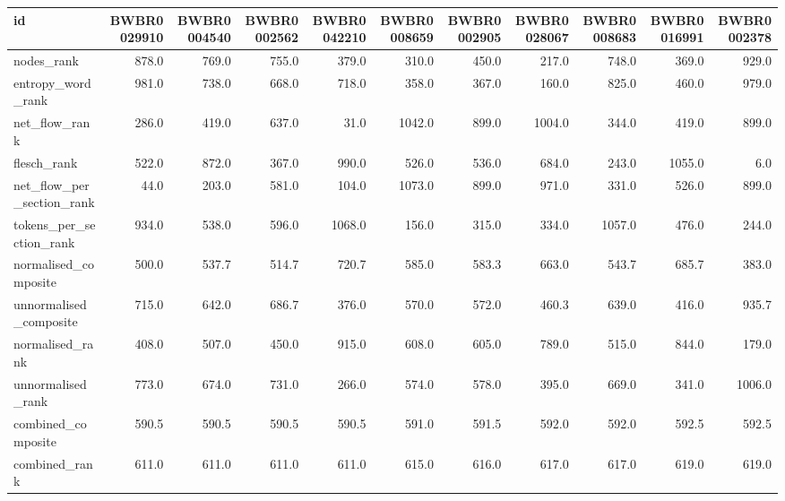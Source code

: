 \begin{tabular}{lrrrrrrrrrr}
\toprule
id & BWBR0029910 & BWBR0004540 & BWBR0002562 & BWBR0042210 & BWBR0008659 & BWBR0002905 & BWBR0028067 & BWBR0008683 & BWBR0016991 & BWBR0002378 \\
\midrule
nodes\_rank & 878.0 & 769.0 & 755.0 & 379.0 & 310.0 & 450.0 & 217.0 & 748.0 & 369.0 & 929.0 \\
\cline{1-11}
entropy\_word\_rank & 981.0 & 738.0 & 668.0 & 718.0 & 358.0 & 367.0 & 160.0 & 825.0 & 460.0 & 979.0 \\
\cline{1-11}
net\_flow\_rank & 286.0 & 419.0 & 637.0 & 31.0 & 1042.0 & 899.0 & 1004.0 & 344.0 & 419.0 & 899.0 \\
\cline{1-11}
flesch\_rank & 522.0 & 872.0 & 367.0 & 990.0 & 526.0 & 536.0 & 684.0 & 243.0 & 1055.0 & 6.0 \\
\cline{1-11}
net\_flow\_per\_section\_rank & 44.0 & 203.0 & 581.0 & 104.0 & 1073.0 & 899.0 & 971.0 & 331.0 & 526.0 & 899.0 \\
\cline{1-11}
tokens\_per\_section\_rank & 934.0 & 538.0 & 596.0 & 1068.0 & 156.0 & 315.0 & 334.0 & 1057.0 & 476.0 & 244.0 \\
\cline{1-11}
normalised\_composite & 500.0 & 537.7 & 514.7 & 720.7 & 585.0 & 583.3 & 663.0 & 543.7 & 685.7 & 383.0 \\
\cline{1-11}
unnormalised\_composite & 715.0 & 642.0 & 686.7 & 376.0 & 570.0 & 572.0 & 460.3 & 639.0 & 416.0 & 935.7 \\
\cline{1-11}
normalised\_rank & 408.0 & 507.0 & 450.0 & 915.0 & 608.0 & 605.0 & 789.0 & 515.0 & 844.0 & 179.0 \\
\cline{1-11}
unnormalised\_rank & 773.0 & 674.0 & 731.0 & 266.0 & 574.0 & 578.0 & 395.0 & 669.0 & 341.0 & 1006.0 \\
\cline{1-11}
combined\_composite & 590.5 & 590.5 & 590.5 & 590.5 & 591.0 & 591.5 & 592.0 & 592.0 & 592.5 & 592.5 \\
\cline{1-11}
combined\_rank & 611.0 & 611.0 & 611.0 & 611.0 & 615.0 & 616.0 & 617.0 & 617.0 & 619.0 & 619.0 \\
\cline{1-11}
\bottomrule
\end{tabular}
